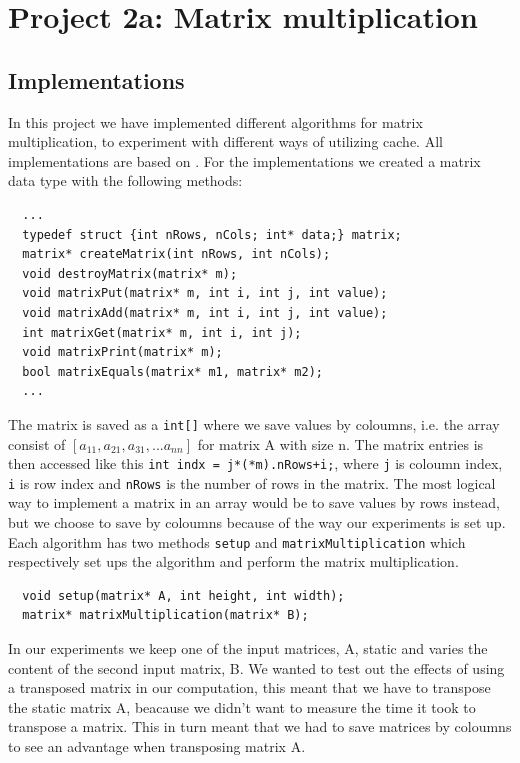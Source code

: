 
\chapter{Project 2a: Matrix multiplication} %

\label{Chapter2} %




\section{Implementations}
In this project we have implemented different algorithms for matrix multiplication, to experiment with different ways of utilizing cache.
All implementations are based on \citep{matrixMultiplication}.
For the implementations we created a matrix data type with the following methods:
\begin{lstlisting}
  ...
  typedef struct {int nRows, nCols; int* data;} matrix;
  matrix* createMatrix(int nRows, int nCols);
  void destroyMatrix(matrix* m);
  void matrixPut(matrix* m, int i, int j, int value);
  void matrixAdd(matrix* m, int i, int j, int value);
  int matrixGet(matrix* m, int i, int j);
  void matrixPrint(matrix* m);
  bool matrixEquals(matrix* m1, matrix* m2);
  ...
\end{lstlisting}
The matrix is saved as a \verb!int[]! where we save values by coloumns, i.e. the array consist of $[a_{11}, a_{21}, a_{31}, ... a_{nn}]$ for matrix A with size n.
The matrix entries is then accessed like this \verb!int indx = j*(*m).nRows+i;!, where \verb!j! is coloumn index, \verb!i! is row index and \verb!nRows! is the number of rows in the matrix.
The most logical way to implement a matrix in an array would be to save values by rows instead, but we choose to save by coloumns because of the way our experiments is set up.
Each algorithm has two methods \verb!setup! and \verb!matrixMultiplication! which respectively set ups the algorithm and perform the matrix multiplication.
\begin{lstlisting}
  void setup(matrix* A, int height, int width);
  matrix* matrixMultiplication(matrix* B);
\end{lstlisting}
In our experiments we keep one of the input matrices, A, static and varies the content of the second input matrix, B. 
We wanted to test out the effects of using a transposed matrix in our computation, this meant that we have to transpose the static matrix A, beacause we didn't want to measure the time it took to transpose a matrix.
This in turn meant that we had to save matrices by coloumns to see an advantage when transposing matrix A. 


